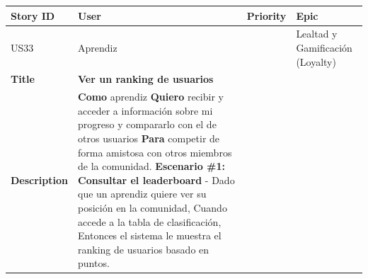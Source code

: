 {\def\LTcaptype{none} %
\begin{longtable}[]{@{}
  >{\raggedright\arraybackslash}p{}
  >{\raggedright\arraybackslash}p{}
  >{\raggedright\arraybackslash}p{}
  >{\raggedright\arraybackslash}p{}@{}}
\toprule\noalign{}
\begin{minipage}[b]{\linewidth}\raggedright
Story ID
\end{minipage} & \begin{minipage}[b]{\linewidth}\raggedright
User
\end{minipage} & \begin{minipage}[b]{\linewidth}\raggedright
Priority
\end{minipage} & \begin{minipage}[b]{\linewidth}\raggedright
Epic
\end{minipage} \\
\midrule\noalign{}
\endhead
\bottomrule\noalign{}
\endlastfoot
US33 & Aprendiz & 3 & Lealtad y Gamificación (Loyalty) \\
\textbf{Title} & \textbf{Ver un ranking de usuarios} & & \\
\textbf{Description} & \textbf{Como} aprendiz \textbf{Quiero} recibir y
acceder a información sobre mi progreso y compararlo con el de otros
usuarios \textbf{Para} competir de forma amistosa con otros miembros de
la comunidad. \textbf{Escenario \#1: Consultar el leaderboard} - Dado
que un aprendiz quiere ver su posición en la comunidad, Cuando accede a
la tabla de clasificación, Entonces el sistema le muestra el ranking de
usuarios basado en puntos. & & \\
\end{longtable}
}

